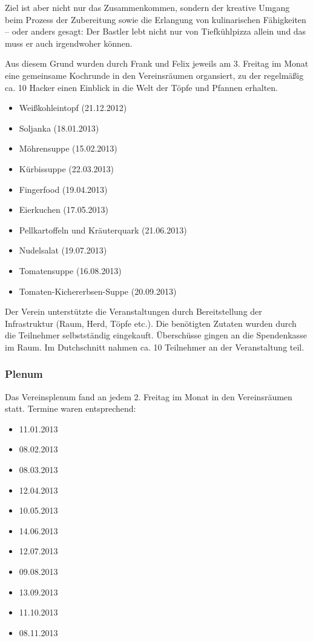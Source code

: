 \documentclass[10pt,DIV16]{scrartcl}
\begin{document}
Ziel ist aber nicht nur das Zusammenkommen, sondern der kreative Umgang
beim Prozess der Zubereitung sowie die Erlangung von kulinarischen
Fähigkeiten -- oder anders gesagt: Der Bastler lebt nicht nur von
Tiefkühlpizza allein und das muss er auch irgendwoher können.

Aus diesem Grund wurden durch Frank und Felix jeweils am 3. Freitag
im Monat eine gemeinsame Kochrunde in den Vereinsräumen organsiert,
zu der regelmäßig ca. 10 Hacker einen Einblick in die Welt der Töpfe
und Pfannen erhalten.

\begin{itemize}
	\item Weißkohleintopf (21.12.2012)
	\item Soljanka (18.01.2013)
	\item Möhrensuppe (15.02.2013)
	\item Kürbissuppe (22.03.2013)
	\item Fingerfood (19.04.2013)
	\item Eierkuchen (17.05.2013)
	\item Pellkartoffeln und Kräuterquark (21.06.2013)
	\item Nudelsalat (19.07.2013)
	\item Tomatensuppe (16.08.2013)
	\item Tomaten-Kichererbsen-Suppe (20.09.2013)
\end{itemize}

Der Verein unterstützte die Veranstaltungen durch Bereitstellung der
Infrastruktur (Raum, Herd, Töpfe etc.). Die benötigten Zutaten wurden
durch die Teilnehmer selbstständig eingekauft. Überschüsse gingen an
die Spendenkasse im Raum. Im Dutchschnitt nahmen ca. 10 Teilnehmer an
der Veranstaltung teil.

\subsubsection{Plenum}

Das Vereinsplenum fand an jedem 2. Freitag im Monat in den
Vereinsräumen statt. Termine waren entsprechend:

\begin{itemize}
	\item 11.01.2013
	\item 08.02.2013
	\item 08.03.2013
	\item 12.04.2013
	\item 10.05.2013
	\item 14.06.2013
	\item 12.07.2013
	\item 09.08.2013
	\item 13.09.2013
	\item 11.10.2013
	\item 08.11.2013
\end{itemize}
\end{document}
